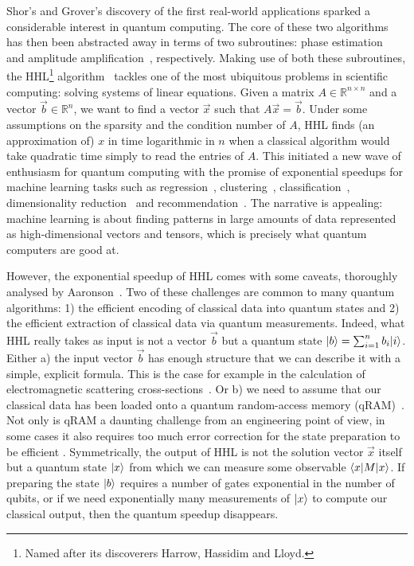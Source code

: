 Shor's and Grover's discovery of the first real-world applications
sparked a considerable interest in quantum computing. The core of these
two algorithms has then been abstracted away in terms of two
subroutines: phase estimation~\cite{Kitaev95} and amplitude
amplification~\cite{BrassardEtAl02}, respectively. Making use of both
these subroutines, the
HHL\footnote{Named after its discoverers Harrow, Hassidim and Lloyd.}
algorithm~\cite{HarrowEtAl09} tackles one of
the most ubiquitous problems in scientific computing: solving systems of linear
equations. Given a matrix $A \in \mathbb{R}^{n \times n}$ and a vector
$\vec{b} \in \mathbb{R}^{n}$, we want to find a vector $\vec{x}$ such that
$A \vec{x} = \vec{b}$. Under some assumptions on the sparsity and the condition
number of $A$, HHL finds (an approximation of) $x$ in time logarithmic in $n$
when a classical algorithm would take quadratic time simply to read the entries
of $A$. This initiated a new wave of enthusiasm for quantum computing
with the promise of exponential speedups for machine learning tasks such as
regression~\cite{WiebeEtAl12}, clustering~\cite{LloydEtAl13},
classification~\cite{RebentrostEtAl14}, dimensionality
reduction~\cite{LloydEtAl14a} and recommendation~\cite{KerenidisPrakash16}.
The narrative is appealing: machine learning is about finding patterns
in large amounts of data represented as high-dimensional vectors and tensors,
which is precisely what quantum computers are good at.

However, the exponential speedup of HHL comes with some caveats,
thoroughly analysed by Aaronson~\cite{Aaronson15}.
Two of these challenges are common to many quantum algorithms:
1) the efficient encoding of classical data into quantum states and
2) the efficient extraction of classical data via quantum measurements.
Indeed, what HHL really takes as input is not a vector $\vec{b}$ but
a quantum state $|b\rangle = \sum_{i=1}^n b_i |i\rangle$.
Either a) the input vector $\vec{b}$ has enough structure that we can describe
it with a simple, explicit formula.
This is the case for example in the calculation of electromagnetic scattering
cross-sections~\cite{CladerEtAl13}.
Or b) we need to assume that our classical data has been loaded onto a
quantum random-access memory (qRAM)~\cite{GiovannettiEtAl08}.
Not only is qRAM a daunting challenge from an engineering point of view,
in some cases it also requires too much error correction
for the state preparation to be efficient \cite{ArunachalamEtAl15}.
Symmetrically, the output of HHL is not the solution vector $\vec{x}$
itself but a quantum state $|x\rangle$ from which we can measure some observable
$\langle x| M |x\rangle$. If preparing the state $|b\rangle$ requires a number of gates
exponential in the number of qubits, or if we need exponentially many
measurements of $|x\rangle$ to compute our classical output, then
the quantum speedup disappears.

